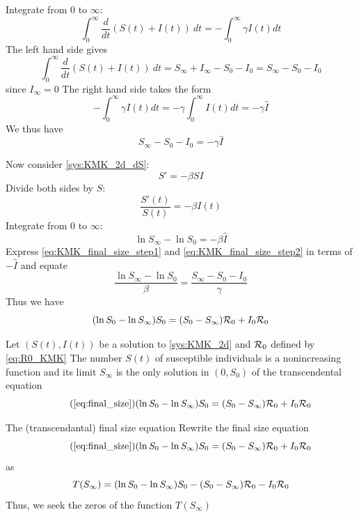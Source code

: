 \documentclass[aspectratio=43]{beamer}
\begin{document}
\begin{frame}{}
  Integrate from 0 to $\infty$:
  $$
  \int_0^\infty\frac{d}{dt}(S(t)+I(t))\ dt=-\int_0^\infty\gamma I(t)dt 
  $$
  The left hand side gives
  $$
  \int_0^\infty\frac{d}{dt}(S(t)+I(t))\ dt
  = S_\infty+I_\infty-S_0-I_0 = S_\infty-S_0-I_0
  $$
  since $I_\infty=0$
  \vfill
  The right hand side takes the form
  $$
  -\int_0^\infty\gamma I(t)dt = -\gamma\int_0^\infty I(t)dt = -\gamma \hat I
  $$
  We thus have
  \begin{equation}
  \label{eq:KMK_final_size_step1}
  S_\infty-S_0-I_0 = -\gamma\hat I
  \end{equation}
\end{frame}



\begin{frame}{}
  Now consider \eqref{sys:KMK_2d_dS}:
  $$
  S' = -\beta SI
  $$
  Divide both sides by $S$:
  $$
  \frac{S'(t)}{S(t)} = -\beta I(t)
  $$
  Integrate from 0 to $\infty$:
  \begin{equation}
  \label{eq:KMK_final_size_step2}
  \ln S_\infty-\ln S_0 = -\beta \hat I
  \end{equation}
  Express \eqref{eq:KMK_final_size_step1} and \eqref{eq:KMK_final_size_step2} in terms of $-\hat I$ and equate
  $$
  \frac{\ln S_\infty-\ln S_0}{\beta}
  =
  \frac{S_\infty-S_0-I_0}{\gamma}
  $$
  Thus we have
  \begin{equation}
  \label{eq:final_size}
  (\ln S_0-\ln S_\infty)S_0 = (S_0-S_\infty)\mathcal{R}_0+I_0\mathcal{R}_0
  \end{equation}
\end{frame}



\begin{frame}{}
\begin{theorem}
  Let $(S(t),I(t))$ be a solution to \eqref{sys:KMK_2d} and $\mathcal{R}_0$ defined by \eqref{eq:R0_KMK}
  \vskip0.5cm
  The number $S(t)$ of susceptible individuals is a nonincreasing function and its limit $S_\infty$ is the only solution in $(0,S_0)$ of the transcendental equation
  \begin{equation}\tag{\ref{eq:final_size}}
  (\ln S_0-\ln S_\infty)S_0 = (S_0-S_\infty)\R_0+I_0\R_0
  \end{equation}
\end{theorem}
\end{frame}



\begin{frame}{The (transcendantal) final size equation}
  Rewrite the final size equation
  \begin{equation}
    \tag{\ref{eq:final_size}}
  (\ln S_0-\ln S_\infty)S_0 = (S_0-S_\infty)\R_0+I_0\R_0
  \end{equation}
  as
  \begin{equation}
  \label{eq:final_size_2}
  T(S_\infty) =(\ln S_0-\ln S_\infty)S_0
  - (S_0-S_\infty)\mathcal{R}_0 -I_0\mathcal{R}_0
\end{equation}
\vfill
Thus, we seek the zeros of the function $T(S_\infty)$
\end{frame}
\end{document}
